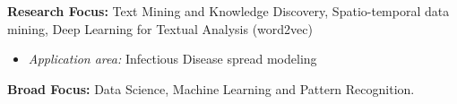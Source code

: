 \par{\textbf{Research Focus: } Text Mining and Knowledge Discovery, Spatio-temporal data mining, Deep Learning for Textual Analysis (word2vec)\vspace{0.5em}
\begin{itemize}
  \item \textit{Application area:} Infectious Disease spread modeling\\
\end{itemize}
        \textbf{Broad Focus:} Data Science, Machine Learning and Pattern Recognition.\vspace{0.5em}
}
\vspace{1em}
